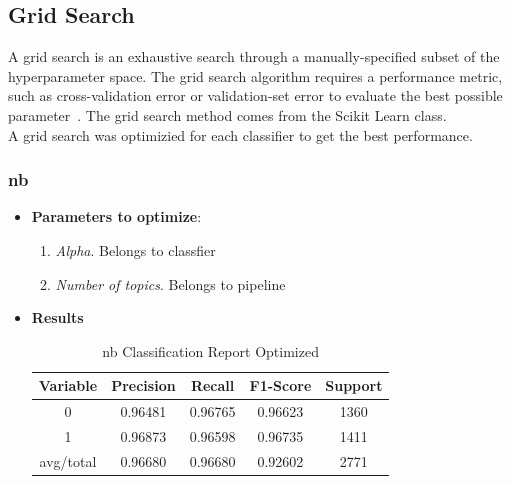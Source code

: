 \subsection{Grid Search}
\label{sec:gs}
A grid search is an exhaustive search through a manually-specified subset of the hyperparameter space. The grid search algorithm requires a performance metric, such as cross-validation error or validation-set error to evaluate the best possible parameter~\cite{gs}. The grid search method comes from the Scikit Learn class.\\
A grid search was optimizied for each classifier to get the best performance. 
\subsubsection{\acl{nb}}
\begin{itemize}
	\item \textbf{Parameters to optimize}:
	\begin{enumerate}
		\item \textit{Alpha}. Belongs to classfier
		\item \textit{Number of topics}. Belongs to pipeline
	\end{enumerate}
	\item \textbf{Results}
		\begin{table}[h!]
			\centering
			\begin{tabular}{||c c c c c||} 
				\hline
				Variable & Precision & Recall & F1-Score & Support \\ [0.5ex] 
				\hline\hline
				0 & 0.96481 & 0.96765 & 0.96623 & 1360 \\ 
				1 & 0.96873 & 0.96598 & 0.96735 & 1411 \\
				avg/total & 0.96680 & 0.96680 & 0.92602 & 2771 \\
				[1ex] 
				\hline
			\end{tabular}
			\caption{\acl{nb} Classification Report Optimized}
			\label{tab:nb2}
		\end{table}
	
\end{itemize}

